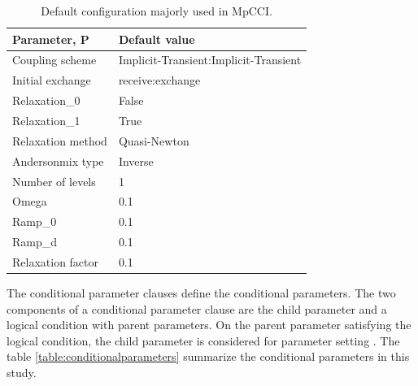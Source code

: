 \begin{table}[htbp]
\begin{center}
\begin{tabular}{|l|l|}
\hline
\textbf{Parameter, P} & \textbf{Default value} \\ \hline
Coupling scheme & Implicit-Transient:Implicit-Transient\\ \hline
Initial exchange & receive:exchange \\ \hline
Relaxation\_0 & False  \\ \hline
Relaxation\_1 & True  \\ \hline
Relaxation method & Quasi-Newton \\ \hline
Andersonmix type & Inverse  \\ \hline
Number of levels  & 1 \\ \hline
Omega & 0.1  \\ \hline
Ramp\_0 & 0.1 \\ \hline
Ramp\_d & 0.1 \\ \hline
Relaxation factor & 0.1 \\ \hline
\end{tabular}
\end{center}
\captionsetup{justification=justified}
\caption[Default parameter configuration of MpCCI]{Default configuration majorly used in MpCCI.}
\label{table:parameterdefaultvalues}
\end{table}

The conditional parameter clauses define the conditional parameters. The two components of a conditional parameter clause are the child parameter and a logical condition with parent parameters. On the parent parameter satisfying the logical condition, the child parameter is considered for parameter setting \cite{Hutterphd}. The table \ref{table:conditionalparameters} summarize the conditional parameters in this study. 


